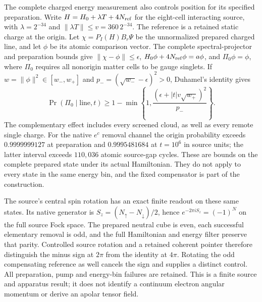 The complete charged energy measurement also controls position for its
specified preparation.  Write $H=H_0+\lambda T+4N_{\rm ref}$ for the
eight-cell interacting source, with $\lambda=2^{-34}$ and
$\|\lambda T\|\leq v=360\,2^{-34}$.  The reference is a retained static
charge at the origin.  Let $\chi=P_I(H)B_r\Psi$ be the unnormalized
prepared charged line, and let $\phi$ be its atomic comparison vector.
The complete spectral-projector and preparation bounds give
$\|\chi-\phi\|\leq\epsilon$, $H_0\phi+4N_{\rm ref}\phi=a\phi$,
and $\Pi_0\phi=\phi$, where $\Pi_0$ requires all nonorigin matter cells
to be gauge singlets.  If $w=\|\phi\|^2\in[w_-,w_+]$ and
$p_-=(\sqrt{w_-}-\epsilon)^2>0$, Duhamel's identity gives
\[
 \Pr(\Pi_0\mid\text{line},t)\geq
 1-\min\left\{1,
 \frac{(\epsilon+|t|v\sqrt{w_+})^2}{p_-}\right\}.
\]
The complementary effect includes every screened cloud, as well as
every remote single charge.  For the native $e^c$ removal channel the
origin probability exceeds $0.9999999127$ at preparation and
$0.9995481684$ at $t=10^6$ in source units; the latter interval exceeds
$110{,}036$ atomic source-gap cycles.  These are bounds on the complete
prepared state under its actual Hamiltonian.  They do not apply to every
state in the same energy bin, and the fixed compensator is part of the
construction.

The source's central spin rotation has an exact finite readout on these
same states.  Its native generator is
$S_z=(N_\uparrow-N_\downarrow)/2$, hence
$e^{-2\pi i S_z}=(-1)^N$ on the full source Fock space.  The prepared
neutral cube is even, each successful elementary removal is odd, and
the full Hamiltonian and energy filter preserve that parity.  Controlled
source rotation and a retained coherent pointer therefore distinguish
the minus sign at $2\pi$ from the identity at $4\pi$.  Rotating the odd
compensating reference as well cancels the sign and supplies a distinct
control.  All preparation, pump and energy-bin failures are retained.
This is a finite source and apparatus result; it does not identify a
continuum electron angular momentum or derive an apolar tensor field.
